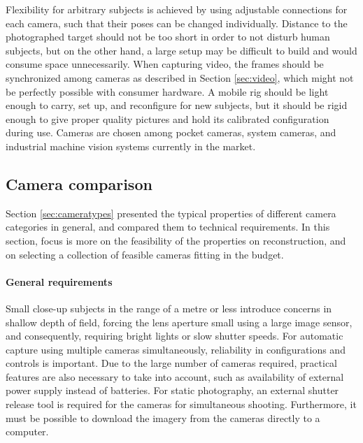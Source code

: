 Flexibility for arbitrary subjects is achieved by using adjustable connections for each camera, such that their poses can be changed individually.
Distance to the photographed target should not be too short in order to not disturb human subjects, but on the other hand, a large setup may be difficult to build and would consume space unnecessarily.
When capturing video, the frames should be synchronized among cameras as described in Section \ref{sec:video}, which might not be perfectly possible with consumer hardware.
A mobile rig should be light enough to carry, set up, and reconfigure for new subjects, but it should be rigid enough to give proper quality pictures and hold its calibrated configuration during use.
Cameras are chosen among pocket cameras, system cameras, and industrial machine vision systems currently in the market.


\subsection{Camera comparison} \label{sec:cameracomparison} %

Section \ref{sec:cameratypes} presented the typical properties of different camera categories in general, and compared them to technical requirements.
In this section, focus is more on the feasibility of the properties on reconstruction, and on selecting a collection of feasible cameras fitting in the budget.

\paragraph{General requirements}
Small close-up subjects in the range of a metre or less introduce concerns in shallow depth of field, forcing the lens aperture small using a large image sensor, and consequently, requiring bright lights or slow shutter speeds.
For automatic capture using multiple cameras simultaneously, reliability in configurations and controls is important.
Due to the large number of cameras required, practical features are also necessary to take into account, such as availability of external power supply instead of batteries.
For static photography, an external shutter release tool is required for the cameras for simultaneous shooting.
Furthermore, it must be possible to download the imagery from the cameras directly to a computer.

